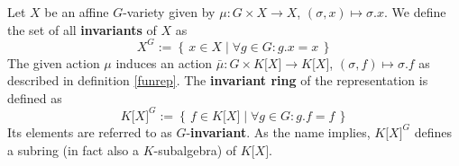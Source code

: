 \begin{definition}[Invariants]
  Let $X$ be an affine $G$-variety given by $\mu \colon G \times X \rightarrow X$, $(\sigma,x) \mapsto \sigma.x$.
  We define the set of all \textbf{invariants} of $X$ as
  \begin{equation}
    X^G := \left\{\, x \in X \mid \forall g \in G : g . x = x \,\right\}
  \end{equation}
  The given action $\mu$ induces an action $ \bar{\mu} \colon G \times K\lbrack X\rbrack \rightarrow K\lbrack X\rbrack $, $(\sigma,f)\mapsto\sigma.f$ as described in definition \ref{funrep}.
  The \textbf{invariant ring} of the representation is defined as
  \begin{equation}
    K\lbrack X\rbrack^G := \left\{ \, f \in K\lbrack X \rbrack \mid \forall g \in G : g . f = f \, \right\}
  \end{equation}
  Its elements are referred to as $G$-\textbf{invariant}.
  As the name implies, $ K\lbrack X\rbrack^G $ defines a subring (in fact also a $K$-subalgebra) of $ K\lbrack X\rbrack $.
\end{definition}
